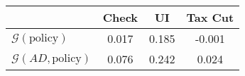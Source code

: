 \begin{tabular}{@{}lccc@{}} 
\toprule 
                          & Check      & UI    & Tax Cut    \\  \midrule 
$\mathcal{G}(\text{policy})$ & 0.017  & 0.185  & -0.001     \\ 
$\mathcal{G}(AD,\text{policy})$ & 0.076  & 0.242  & 0.024     \\ 
\end{tabular}  

